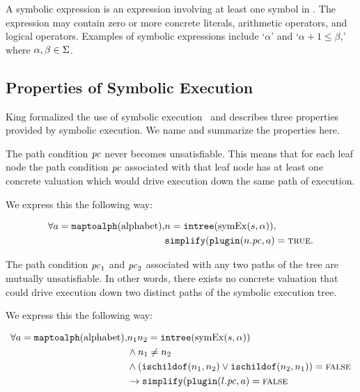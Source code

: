 A symbolic expression \symexpression{} is an expression involving at least one
symbol in \symalphabet. The expression may contain zero or more concrete
literals, arithmetic operators, and logical operators. Examples of
symbolic expressions include `$\alpha$' and `$\alpha + 1 \le \beta$,' where $\alpha,
\beta \in \Sigma$.



\subsection{Properties of Symbolic Execution}
King formalized the use of symbolic execution~\cite{king1976symbolic} and describes three
properties provided by symbolic execution. We name and summarize the properties
here.
\setcounter{property}{0}
\renewcommand{\theproperty}{K.\arabic{property}}
\begin{property}
  \label{prop:kingsound}
  The path condition $\mathit{pc}$ never becomes unsatisfiable. This means that for each
  leaf node the path condition $\mathit{pc}$ associated with that leaf node has at
  least one concrete valuation which would drive execution down the same path of
  execution.
  
  We express this the following way: 
  
  \begin{align*}
  \forall a = \mathtt{maptoalph}(\mathrm{alphabet}), & n =
\mathtt{intree}(\mathrm{symEx}(s,\alpha)), \\
 & \mathtt{simplify}(\mathtt{plugin}(n.\mathit{pc},a) = \mathtt{\textsc{true}}.
  \end{align*}
  
\end{property}


\begin{property}
  \label{prop:kingunique}
The path condition $\mathit{pc}_1$ and $\mathit{pc}_2$ associated with any two paths of the
tree are mutually unsatisfiable. In other words, there exists no concrete
valuation that could drive execution down two distinct paths of the symbolic
execution tree.

We express this the following way: 

\begin{align*}
\forall a = \mathtt{maptoalph}(\mathrm{alphabet}), &  n_1 n_2 =
\mathtt{intree}(\mathrm{symEx}(s,\alpha)) \\
& \wedge
n_1 \neq n_2 \\
&  \wedge
(\mathtt{ischildof}(n_1, n_2) \vee  \mathtt{ischildof}(n_2, n_1))= \mathtt{\textsc{false}} \\
&\rightarrow \mathtt{simplify}(\mathtt{plugin}(l.\mathit{pc},a) = \mathtt{\textsc{false}}
\end{align*}
\end{property}

